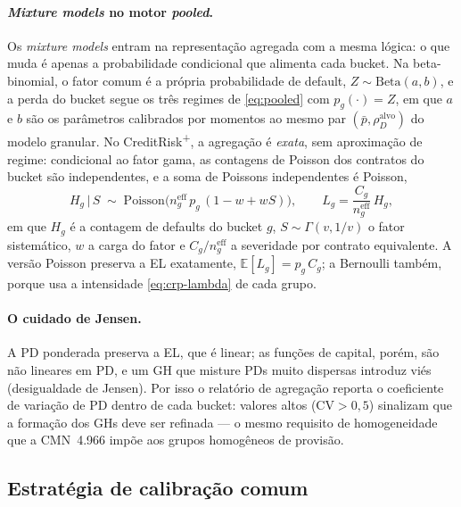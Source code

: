 \documentclass[11pt,a4paper]{article}
\newcommand{\E}{\mathbb{E}}
\begin{document}
\paragraph{\emph{Mixture models} no motor \emph{pooled}.} Os \emph{mixture models} entram na representação agregada com a mesma lógica: o que muda é apenas a probabilidade condicional que alimenta cada bucket. Na beta-binomial, o fator comum é a própria probabilidade de default, $Z\sim\mathrm{Beta}(a,b)$, e a perda do bucket segue os três regimes de \eqref{eq:pooled} com $p_g(\cdot)=Z$, em que $a$ e $b$ são os parâmetros calibrados por momentos ao mesmo par $(\bar p,\rho_D^{\mathrm{alvo}})$ do modelo granular. No CreditRisk\textsuperscript{+}, a agregação é \emph{exata}, sem aproximação de regime: condicional ao fator gama, as contagens de Poisson dos contratos do bucket são independentes, e a soma de Poissons independentes é Poisson,
\begin{equation}
H_g \,\big|\, S \;\sim\; \mathrm{Poisson}\bigl(n_g^{\mathrm{eff}}\,p_g\,(1-w+wS)\bigr),
\qquad
L_g=\frac{C_g}{n_g^{\mathrm{eff}}}\,H_g,
\label{eq:crplus-pooled}
\end{equation}
em que $H_g$ é a contagem de defaults do bucket $g$, $S\sim\Gamma(v,1/v)$ o fator sistemático, $w$ a carga do fator e $C_g/n_g^{\mathrm{eff}}$ a severidade por contrato equivalente. A versão Poisson preserva a EL exatamente, $\E[L_g]=p_g\,C_g$; a Bernoulli também, porque usa a intensidade \eqref{eq:crp-lambda} de cada grupo.

\paragraph{O cuidado de Jensen.} A PD ponderada preserva a EL, que é linear; as funções de capital, porém, são não lineares em PD, e um GH que misture PDs muito dispersas introduz viés (desigualdade de Jensen). Por isso o relatório de agregação reporta o coeficiente de variação de PD dentro de cada bucket: valores altos ($\mathrm{CV}>0{,}5$) sinalizam que a formação dos GHs deve ser refinada --- o mesmo requisito de homogeneidade que a CMN~4.966 impõe aos grupos homogêneos de provisão.

\subsection{Estratégia de calibração comum}
\end{document}
